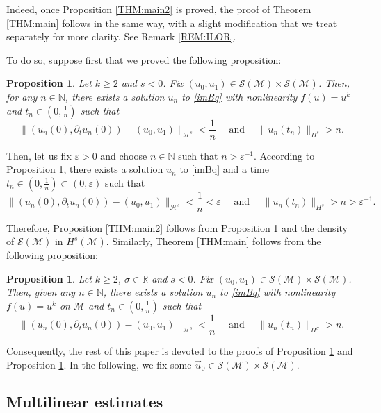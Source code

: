 \documentclass[letterpaper, 11pt,  reqno]{amsart}
\newtheorem{proposition}[theorem]{Proposition}
\newcommand{\1}{\hspace{0.5mm}\text{I}\hspace{0.5mm}}
\newcommand{\noi}{\noindent}
\newcommand{\R}{\mathbb{R}}
\newcommand{\M}{\mathcal{M}}
\newcommand{\NB}{\mathbb{N}}
\renewcommand{\H}{\mathcal{H}}
\newcommand{\eps}{\varepsilon}
\newcommand{\s}{\sigma}
\newcommand{\dt}{\partial_t}
\numberwithin{equation}{section}
\numberwithin{theorem}{section}
\begin{document}
Indeed, once Proposition \ref{THM:main2} is proved, the proof of Theorem \ref{THM:main} follows in the same way, with a slight modification that we treat separately for more clarity. See Remark \ref{REM:ILOR}.

To do so, suppose first that we proved the following proposition:

\begin{proposition}
\label{PROP:final2}
Let $k \geq 2$ and $s < 0$. Fix $(u_0, u_1) \in \mathcal{S} ( \M) \times \mathcal{S}(\M)$. Then, for any $n \in \NB$, there exists a solution $u_n$ to \eqref{imBq} with nonlinearity $f(u) = u^k$ and $t_n \in (0, \frac 1n )$ such that
\begin{equation}
\label{EQ:propFinal}
\| (u_n (0), \dt u_n (0)) - (u_0 , u_1) \|_{\H^s} < \frac 1n \quad \text{ and } \quad \| u_n (t_n ) \|_{H^s} > n.
\end{equation}
\end{proposition}

\noi Then, let us fix $\eps > 0$ and choose $n \in \NB$ such that $n > \eps^{-1}$. According to Proposition \ref{PROP:final2}, there exists a solution $u_n$ to \eqref{imBq} and a time $t_n \in (0, \frac 1n ) \subset (0, \eps)$ such that 
$$
\| (u_n (0), \dt u_n (0)) - (u_0 , u_1) \|_{\H^s} < \frac 1n < \eps \quad \text{ and } \quad \| u_n (t_n ) \|_{H^s} > n > \eps^{-1}.
$$

\noi Therefore, Proposition \ref{THM:main2} follows from Proposition \ref{PROP:final2} and the density of $\mathcal{S}(\M)$ in $H^s (\M)$. Similarly, Theorem \ref{THM:main} follows from the following proposition:

\begin{proposition}
\label{PROP:final}
Let $k \geq 2$, $\s \in \R$ and $s < 0$. Fix $(u_0 , u_1) \in \mathcal{S} ( \M) \times \mathcal{S}(\M)$. Then, given any $n \in \NB$, there exists a solution $u_n$ to \eqref{imBq} with nonlinearity $f(u) = u^k$ on $\M$ and $t_n \in (0, \frac 1n )$ such that
$$
\| (u_n (0), \dt u_n (0)) - (u_0 , u_1) \|_{\H^s} < \frac 1n \quad \text{ and } \quad \| u_n (t_n) \|_{H^\s} > n.
$$
\end{proposition}





Consequently, the rest of this paper is devoted to the proofs of Proposition \ref{PROP:final2} and Proposition \ref{PROP:final}. In the following, we fix some $\vec{u}_0 \in \mathcal{S} ( \M) \times \mathcal{S}(\M)$.

\subsection{Multilinear estimates}
\end{document}
